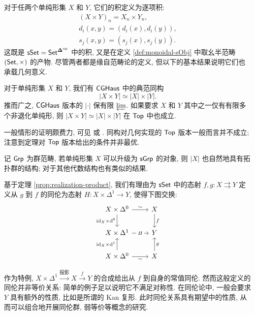 对于任两个单纯形集 $X$ 和 $Y$, 它们的积定义为逐项积:
\begin{gather*}
	(X \times Y)_n = X_n \times Y_n, \\
	d_i(x, y) = (d_i(x), d_i(y)), \\
	s_j(x, y) = (s_j(x), s_j(y)).
\end{gather*}
这既是 $\mathsf{sSet} = \mathsf{Set}^{\bm\Delta^{\operatorname{op}}}$ 中的积, 又是在定义 \ref{def:monoidal-sObj} 中取幺半范畴 $(\mathsf{Set}, \times)$ 的产物. 尽管两者都是缘自范畴论的定义, 但以下的基本结果说明它们也承载几何意义.

\begin{theorem}\label{prop:realization-product}
	对于单纯形集 $X$ 和 $Y$, 我们有 $\mathsf{CGHaus}$ 中的典范同构
	\[ |X \times Y| \simeq |X| \times |Y|. \]
	推而广之, $\mathsf{CGHaus}$ 版本的 $|\cdot|$ 保有限 $\varprojlim$. 如果要求 $X$ 和 $Y$ 其中之一仅有有限多个非退化单纯形, 则 $|X \times Y| \simeq |X| \times |Y|$ 在 $\mathsf{Top}$ 中也成立. 
\end{theorem}

一般情形的证明颇费力, 可见 \cite[Chapter III]{GZ67} 或 \cite{Dri03}. 同构对几何实现的 $\mathsf{Top}$ 版本一般而言并不成立; 注意到定理对 $\mathsf{Top}$ 版本给出的条件并非最优.

\begin{corollary}
	记 $\mathsf{Grp}$ 为群范畴, 若单纯形集 $X$ 可以升级为 $\mathsf{sGrp}$ 的对象, 则 $|X|$ 也自然地具有拓扑群的结构; 对于其他代数结构也有类似的结果.
\end{corollary}

基于定理 \ref{prop:realization-product}, 我们有理由为 $\mathsf{sSet}$ 中的态射 $f, g: X \rightrightarrows Y$ 定义从 $g$ 到 $f$ 的同伦为态射 $H: X \times \Delta^1 \to Y$, 使得下图交换:
\begin{equation}\label{eqn:simplicial-homotopy-prep}
	\begin{tikzcd}
		X \times \Delta^0 \arrow[d, "{\identity_X \times \mathrm{d}^0}"'] \arrow[r, "\sim"] & X \arrow[d, "f"] \\
		X \times \Delta^1 \arrow[r, "H" description] & Y \\
		X \times \Delta^0 \arrow[u, "{\identity_X \times \mathrm{d}^1}"] \arrow[r, "\sim"'] & X \arrow[u, "g"']
	\end{tikzcd}
\end{equation}

作为特例, $X \times \Delta^1 \xrightarrow{\text{投影}} X \xrightarrow{f} Y$ 的合成给出从 $f$ 到自身的常值同伦. 然而这般定义的同伦并非等价关系: 简单的例子足以说明它不满足对称性. 在同伦论中, 一般会要求 $Y$ 具有额外的性质, 比如是所谓的 Kan 复形. 此时同伦关系具有期望中的性质, 从而可以组合地开展同伦群, 弱等价等概念的研究.

